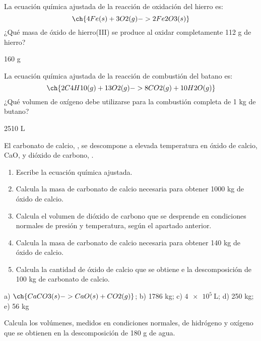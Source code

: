 \documentclass[
]{article}
\providecommand{\tightlist}{%
  \setlength{\itemsep}{0pt}\setlength{\parskip}{0pt}}
\begin{document}
\begin{exercise}[tags=OXF16] La ecuación química ajustada de la reacción
de oxidación del hierro es: \[\ch{4 Fe(s) + 3 O2(g) -> 2 Fe2O3(s)}\]
¿Qué masa de óxido de hierro(III) se produce al oxidar completamente 112
g de hierro?\end{exercise}

\begin{solution}160 g\end{solution}

\begin{exercise}[tags=OXF16] La ecuación química ajustada de la reacción
de combustión del batano es:
\[\ch{2 C4H10(g) + 13 O2(g) -> 8 CO2(g) + 10 H2O(g)}\] ¿Qué volumen de
oxígeno debe utilizarse para la combustión completa de 1 kg de
butano?\end{exercise}

\begin{solution}2510 L\end{solution}

\begin{exercise}[tags=OXF16] El carbonato de calcio, , se
descompone a elevada temperatura en óxido de calcio, CaO, y dióxido de
carbono, .

\begin{enumerate}
\def\labelenumi{\alph{enumi})}
\tightlist
\item
  Escribe la ecuación química ajustada.
\item
  Calcula la masa de carbonato de calcio necesaria para obtener 1000 kg
  de óxido de calcio.
\item
  Calcula el volumen de dióxido de carbono que se desprende en
  condiciones normales de presión y temperatura, según el apartado
  anterior.
\item
  Calcula la masa de carbonato de calcio necesaria para obtener 140 kg
  de óxido de calcio.
\item
  Calcula la cantidad de óxido de calcio que se obtiene e la
  descomposición de 100 kg de carbonato de calcio.
\end{enumerate}

\end{exercise}

\begin{solution}a) \(\ch{CaCO3(s) -> CaO(s) + CO2(g)}\); b) 1786 kg; c)
\(\SI{4e5}{\L}\); d) 250 kg; e) 56 kg\end{solution}

\begin{exercise}[tags=OXF16] Calcula los volúmenes, medidos en
condiciones normales, de hidrógeno y oxígeno que se obtienen en la
descomposición de 180 g de agua.\end{exercise}
\end{document}

